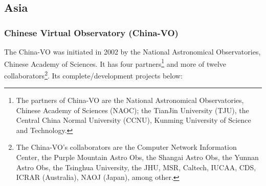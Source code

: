 \subsection{Asia}
\subsubsection{Chinese Virtual Observatory (China-VO)}
The China-VO \cite{website:china-vo-home} was initiated in 2002 by the National
Astronomical Observatories, Chinese Academy of Sciences. It has four
partners\footnote{The partners of China-VO are the National Astronomical
Observatories, Chinese Academy of Sciences (NAOC); the TianJin University (TJU),
the Central China Normal University (CCNU), Kunming University of Science and
Technology.} and more of twelve collaborators\footnote{The China-VO's
collaborators are the Computer Network Information Center, the Purple Mountain
Astro Obs, the Shangai Astro Obs, the Yunnan Astro Obs, the Tsinghua University,
the JHU, MSR, Caltech, IUCAA, CDS, ICRAR (Australia), NAOJ (Japan), among
other.}. Its complete/development projects below:

